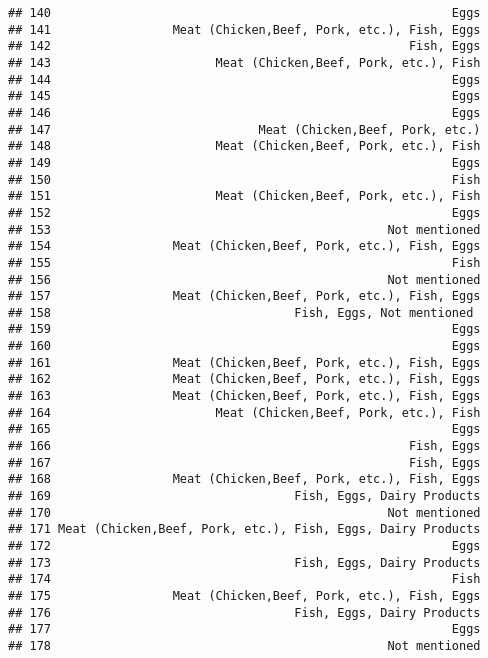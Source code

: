 \documentclass[
]{article}
\begin{document}
\begin{verbatim}
## 140                                                        Eggs
## 141                 Meat (Chicken,Beef, Pork, etc.), Fish, Eggs
## 142                                                  Fish, Eggs
## 143                       Meat (Chicken,Beef, Pork, etc.), Fish
## 144                                                        Eggs
## 145                                                        Eggs
## 146                                                        Eggs
## 147                             Meat (Chicken,Beef, Pork, etc.)
## 148                       Meat (Chicken,Beef, Pork, etc.), Fish
## 149                                                        Eggs
## 150                                                        Fish
## 151                       Meat (Chicken,Beef, Pork, etc.), Fish
## 152                                                        Eggs
## 153                                               Not mentioned
## 154                 Meat (Chicken,Beef, Pork, etc.), Fish, Eggs
## 155                                                        Fish
## 156                                               Not mentioned
## 157                 Meat (Chicken,Beef, Pork, etc.), Fish, Eggs
## 158                                  Fish, Eggs, Not mentioned 
## 159                                                        Eggs
## 160                                                        Eggs
## 161                 Meat (Chicken,Beef, Pork, etc.), Fish, Eggs
## 162                 Meat (Chicken,Beef, Pork, etc.), Fish, Eggs
## 163                 Meat (Chicken,Beef, Pork, etc.), Fish, Eggs
## 164                       Meat (Chicken,Beef, Pork, etc.), Fish
## 165                                                        Eggs
## 166                                                  Fish, Eggs
## 167                                                  Fish, Eggs
## 168                 Meat (Chicken,Beef, Pork, etc.), Fish, Eggs
## 169                                  Fish, Eggs, Dairy Products
## 170                                               Not mentioned
## 171 Meat (Chicken,Beef, Pork, etc.), Fish, Eggs, Dairy Products
## 172                                                        Eggs
## 173                                  Fish, Eggs, Dairy Products
## 174                                                        Fish
## 175                 Meat (Chicken,Beef, Pork, etc.), Fish, Eggs
## 176                                  Fish, Eggs, Dairy Products
## 177                                                        Eggs
## 178                                               Not mentioned

\end{verbatim}
\end{document}
